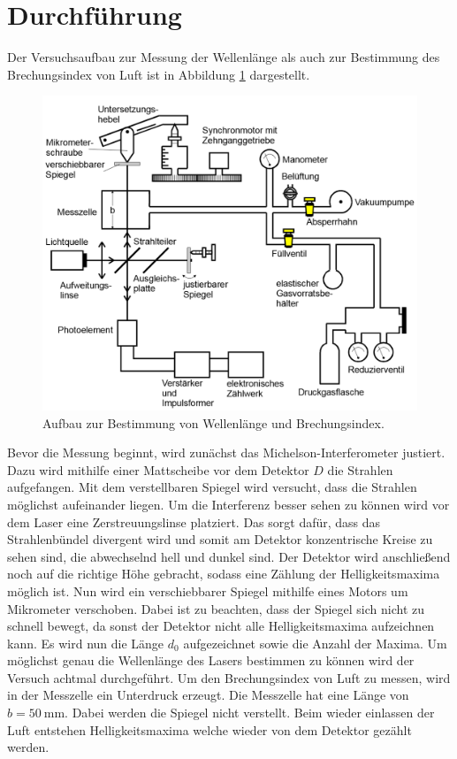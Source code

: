 \section{Durchführung}
Der Versuchsaufbau zur Messung der Wellenlänge als auch
zur Bestimmung des Brechungsindex von Luft ist in Abbildung \ref{abb:3}
dargestellt.
\begin{figure}[H]
  \centering
  \includegraphics[width=\textwidth]{content/Aufbau3.png}
  \caption{Aufbau zur Bestimmung von Wellenlänge und Brechungsindex.\cite{1}}
  \label{abb:3}
\end{figure}
Bevor die Messung beginnt, wird zunächst das Michelson-Interferometer justiert.
Dazu wird mithilfe einer Mattscheibe vor dem Detektor $D$ die Strahlen aufgefangen.
Mit dem verstellbaren Spiegel wird versucht, dass die Strahlen möglichst aufeinander liegen.
Um die Interferenz besser sehen zu können wird vor dem Laser eine Zerstreuungslinse platziert.
Das sorgt dafür, dass das Strahlenbündel divergent wird und somit am Detektor konzentrische
Kreise zu sehen sind, die abwechselnd hell und dunkel sind.
Der Detektor wird anschließend noch auf die richtige Höhe gebracht, sodass eine Zählung
der Helligkeitsmaxima möglich ist.
Nun wird ein verschiebbarer Spiegel mithilfe eines Motors um Mikrometer verschoben.
Dabei ist zu beachten, dass der Spiegel sich nicht zu schnell bewegt, da sonst der
Detektor nicht alle Helligkeitsmaxima aufzeichnen kann.
Es wird nun die Länge $d_0$ aufgezeichnet sowie die Anzahl der Maxima. Um möglichst
genau die Wellenlänge des Lasers bestimmen zu können wird der Versuch achtmal durchgeführt.
Um den Brechungsindex von Luft zu messen, wird in der Messzelle ein Unterdruck
erzeugt. Die Messzelle hat eine Länge von $b = \SI{50}{\milli\meter}$.
Dabei werden die Spiegel nicht verstellt. Beim wieder einlassen der Luft entstehen Helligkeitsmaxima
welche wieder von dem Detektor gezählt werden.
